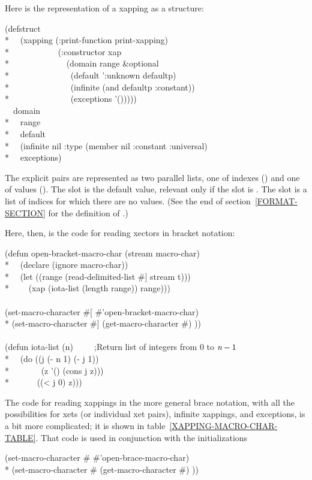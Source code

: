 \begin{defun}[Function]
\begin{new}
Here is the representation of a xapping as a structure:
\begin{lisp}
(defstruct \\*
~~(xapping (:print-function print-xapping) \\*
~~~~~~~~~~~(:constructor xap \\*
~~~~~~~~~~~~~(domain range \&optional \\*
~~~~~~~~~~~~~~(default ':unknown defaultp) \\*
~~~~~~~~~~~~~~(infinite (and defaultp :constant)) \\*
~~~~~~~~~~~~~~(exceptions '())))) \\
~~domain \\*
~~range \\*
~~default \\*
~~(infinite nil :type (member nil :constant :universal) \\*
~~exceptions)
\end{lisp}
The explicit pairs are represented as two parallel lists, one of indexes ()
and one of values ().  The  slot is the default value, relevant
only if the  slot is .
The  slot is a list of indices for which there are no values.
(See the end of section~\ref{FORMAT-SECTION} for the definition of .)

Here, then, is the code for reading xectors in bracket notation:
\begin{lisp}
(defun open-bracket-macro-char (stream macro-char) \\*
~~(declare (ignore macro-char)) \\*
~~(let ((range (read-delimited-list \#{\Xbackslash}] stream t))) \\*
~~~~(xap (iota-list (length range)) range))) \\
 \\
(set-macro-character \#{\Xbackslash}[ \#'open-bracket-macro-char) \\*
(set-macro-character \#{\Xbackslash}] (get-macro-character \#{\Xbackslash}) )) \\
 \\
(defun iota-list (n)~~~~~;{\rm Return list of integers from $0$ to $\emph{n}-1$}\\*
~~(do ((j (- n 1) (- j 1)) \\*
~~~~~~~(z '() (cons j z))) \\*
~~~~~~((< j 0) z)))
\end{lisp}
The code for reading xappings in the more general brace notation, with all the
possibilities for xets (or individual xet pairs), infinite xappings, and exceptions,
is a bit more complicated; it is shown in table~\ref{XAPPING-MACRO-CHAR-TABLE}.
That code is used in conjunction with the initializations
\begin{lisp}
(set-macro-character \#{\Xbackslash}{\Xlbrace} \#'open-brace-macro-char) \\*
(set-macro-character \#{\Xbackslash}{\Xrbrace} (get-macro-character \#{\Xbackslash}) ))
\end{lisp}
\end{new}
\end{defun}



